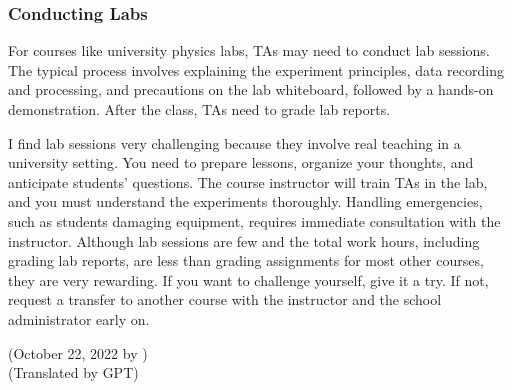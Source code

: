 \subsubsection{Conducting Labs}
\begin{minipage}[t]{0.55\textwidth}
    For courses like university physics labs, TAs may need to conduct lab sessions. The typical process involves explaining the experiment principles, data recording and processing, and precautions on the lab whiteboard, followed by a hands-on demonstration. After the class, TAs need to grade lab reports.

    I find lab sessions very challenging because they involve real teaching in a university setting. You need to prepare lessons, organize your thoughts, and anticipate students' questions. The course instructor will train TAs in the lab, and you must understand the experiments thoroughly. Handling emergencies, such as students damaging equipment, requires immediate consultation with the instructor. Although lab sessions are few and the total work hours, including grading lab reports, are less than grading assignments for most other courses, they are very rewarding. If you want to challenge yourself, give it a try. If not, request a transfer to another course with the instructor and the school administrator early on.
    \begin{flushright}
        (October 22, 2022 by \Wu) \\
        (Translated by GPT)
    \end{flushright}
\end{minipage}
%
